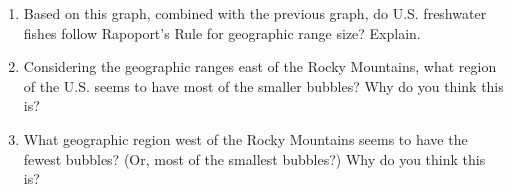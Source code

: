 \documentclass[11pt]{article}
\begin{document}
\begin{enumerate}[resume]
	\item Based on this graph, combined with the previous graph, do
U.S. freshwater fishes follow Rapoport's Rule for geographic range size?
Explain.

	\vspace{9\baselineskip}

	\item Considering the geographic ranges east of the Rocky
Mountains, what region of the U.S. seems to have most of the
smaller bubbles? Why do you think this is?

	\vspace{9\baselineskip}

	\item What geographic region west of the Rocky Mountains seems to
have the fewest bubbles? (Or, most of the smallest bubbles?) Why do you think this is? 
\end{enumerate}
\end{document}

